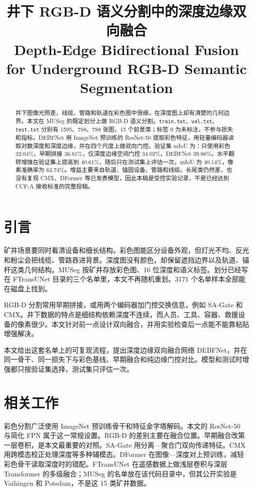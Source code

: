 \documentclass[11pt]{article}
\title{井下 RGB-D 语义分割中的深度边缘双向融合\\
\large Depth-Edge Bidirectional Fusion for Underground RGB-D Semantic Segmentation}
\author{}
\date{}
\begin{document}
\maketitle

\begin{abstract}
井下图像光照差，线缆、管路和轨道在彩色图中很细，在深度图上却有清楚的几何边界。本文在 MUSeg 的既定划分上做 RGB-D 语义分割。\texttt{train.txt}、\texttt{val.txt}、\texttt{test.txt} 分别有 1595、788、788 张图，15 个前景类；标签 0 为未标注，不参与损失和指标。DEBFNet 用 ImageNet 预训练的 ResNet-50 提取彩色特征，用轻量编码器读取对数深度和深度边缘，并在四个尺度上做双向门控。验证集 mIoU 为：只使用彩色 32.04\%，早期拼接 36.61\%，仅深度边缘空间门控 34.02\%，DEBFNet 39.86\%。水平翻转增强在验证集上提高到 40.61\%，随后只在测试集上评估一次，mIoU 为 40.14\%，像素准确率为 63.74\%。增益主要来自轨道、锚固设备、管路和线缆。长尾类仍然差，也没有复现 CMX、DFormer 等已发表模型，因此本稿是受控实验记录，不是已经达到 CCF-A 接收标准的完整投稿。
\end{abstract}

\section{引言}

矿井场景要同时看清设备和细长结构。彩色图能区分设备外观，但灯光不均、反光和粉尘会把线缆、管路吞进背景。深度图没有颜色，却保留遮挡边界以及轨道、锚杆这类几何结构。MUSeg 按矿井存放彩色图、16 位深度和语义标签。划分已经写在 FTransUNet 目录的三个名单里，本文不再随机重划。3171 个名单样本全部能在磁盘上找到。

RGB-D 分割常用早期拼接，或用两个编码器加门控交换信息，例如 SA-Gate 和 CMX。井下数据的特点是细结构依赖深度不连续，而人员、工具、容器、救援设备的像素很少。本文针对前一点设计双向融合，并用实验检查后一点能不能靠粘贴增强解决。

本文给出这套名单上的可复现流程，提出深度边缘双向融合网络 DEBFNet，并在同一骨干、同一损失下与彩色基线、早期融合和纯边缘门控对比。模型和测试时增强都只按验证集选择，测试集只评估一次。

\section{相关工作}

彩色分割广泛使用 ImageNet 预训练骨干和特征金字塔解码。本文的 ResNet-50 与简化 FPN 属于这一常规设置。RGB-D 的差别主要在融合位置。早期融合改第一层卷积，是本文最重要的对照。SA-Gate 用分离—聚合门双向传递特征。CMX 用跨模态校正处理深度等多种辅模态。DFormer 在图像—深度对上预训练，减轻彩色骨干读取深度时的错配。FTransUNet 在遥感数据上做浅层卷积与深层 Transformer 的多级融合；MUSeg 的名单放在该代码目录中，但其公开实验是 Vaihingen 和 Potsdam，不是这 15 类矿井数据。
\end{document}
